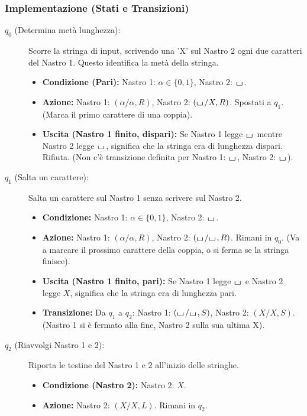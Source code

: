 \documentclass[a4paper]{article}
\theoremstyle{definition} %
\newcommand{\blankS}{\ensuremath{\raisebox{-0.15ex}{\scalebox{1.3}[0.7]{$\sqcup$}}\mkern2mu}}
\begin{document}
\subsubsection{Implementazione (Stati e Transizioni)}
\begin{description}
    \item[$q_0$ (Determina metà lunghezza):] Scorre la stringa di input, scrivendo una 'X' sul Nastro 2 ogni due caratteri del Nastro 1. Questo identifica la metà della stringa.
    \begin{itemize}
        \item \textbf{Condizione (Pari):} Nastro 1: $\alpha \in \{0,1\}$, Nastro 2: $\blankS$.
        \item \textbf{Azione:} Nastro 1: $(\alpha/\alpha, R)$, Nastro 2: $(\blankS/X, R)$. Spostati a $q_1$. (Marca il primo carattere di una coppia).
        \item \textbf{Uscita (Nastro 1 finito, dispari):} Se Nastro 1 legge $\blankS$ mentre Nastro 2 legge $\blankS$, significa che la stringa era di lunghezza dispari. Rifiuta. (Non c'è transizione definita per Nastro 1: $\blankS$, Nastro 2: $\blankS$).
    \end{itemize}
    \item[$q_1$ (Salta un carattere):] Salta un carattere sul Nastro 1 senza scrivere sul Nastro 2.
    \begin{itemize}
        \item \textbf{Condizione:} Nastro 1: $\alpha \in \{0,1\}$, Nastro 2: $\blankS$.
        \item \textbf{Azione:} Nastro 1: $(\alpha/\alpha, R)$, Nastro 2: $(\blankS/\blankS, R)$. Rimani in $q_0$. (Va a marcare il prossimo carattere della coppia, o si ferma se la stringa finisce).
        \item \textbf{Uscita (Nastro 1 finito, pari):} Se Nastro 1 legge $\blankS$ e Nastro 2 legge $X$, significa che la stringa era di lunghezza pari.
        \item \textbf{Transizione:} Da $q_1$ a $q_2$: Nastro 1: $(\blankS/\blankS, S)$, Nastro 2: $(X/X, S)$. (Nastro 1 si è fermato alla fine, Nastro 2 sulla sua ultima X).
    \end{itemize}
    \item[$q_2$ (Riavvolgi Nastro 1 e 2):] Riporta le testine del Nastro 1 e 2 all'inizio delle stringhe.
    \begin{itemize}
        \item \textbf{Condizione (Nastro 2):} Nastro 2: $X$.
        \item \textbf{Azione:} Nastro 2: $(X/X, L)$. Rimani in $q_2$.

\end{itemize}
\end{description}
\end{document}
